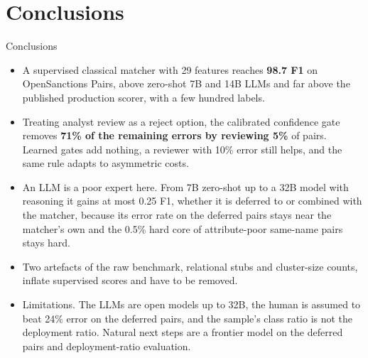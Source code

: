 \documentclass[aspectratio=169,10pt]{beamer}
\newcommand{\hi}[1]{\textcolor{accent2}{\textbf{#1}}}
\begin{document}
\section{Conclusions}

\begin{frame}{Conclusions}
\begin{itemize}
\item A supervised classical matcher with 29 features reaches \hi{98.7 F1} on OpenSanctions Pairs, above zero-shot 7B and 14B LLMs and far above the published production scorer, with a few hundred labels.
\item Treating analyst review as a reject option, the calibrated confidence gate removes \hi{71\% of the remaining errors by reviewing 5\%} of pairs. Learned gates add nothing, a reviewer with 10\% error still helps, and the same rule adapts to asymmetric costs.
\item An LLM is a poor expert here. From 7B zero-shot up to a 32B model with reasoning it gains at most 0.25 F1, whether it is deferred to or combined with the matcher, because its error rate on the deferred pairs stays near the matcher's own and the 0.5\% hard core of attribute-poor same-name pairs stays hard.
\item Two artefacts of the raw benchmark, relational stubs and cluster-size counts, inflate supervised scores and have to be removed.
\item Limitations. The LLMs are open models up to 32B, the human is assumed to beat 24\% error on the deferred pairs, and the sample's class ratio is not the deployment ratio. Natural next steps are a frontier model on the deferred pairs and deployment-ratio evaluation.
\end{itemize}
\end{frame}
\end{document}
